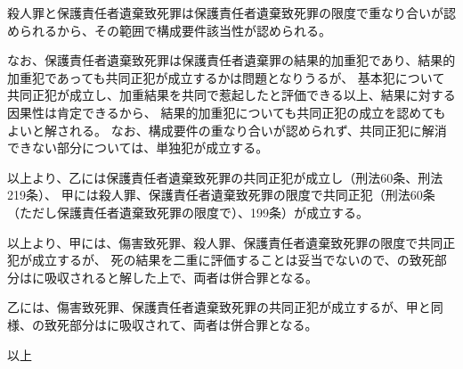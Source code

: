 \documentclass[11pt]{jsarticle}
\begin{document}
		殺人罪と保護責任者遺棄致死罪は保護責任者遺棄致死罪の限度で重なり合いが認められるから、その範囲で構成要件該当性が認められる。
		
	
		なお、保護責任者遺棄致死罪は保護責任者遺棄罪の結果的加重犯であり、結果的加重犯であっても共同正犯が成立するかは問題となりうるが、
		基本犯について共同正犯が成立し、加重結果を共同で惹起したと評価できる以上、結果に対する因果性は肯定できるから、
		結果的加重犯についても共同正犯の成立を認めてもよいと解される。
		なお、構成要件の重なり合いが認められず、共同正犯に解消できない部分については、単独犯が成立する。
		
		以上より、乙には保護責任者遺棄致死罪の共同正犯が成立し（刑法60条、刑法219条）、
		甲には殺人罪、保護責任者遺棄致死罪の限度で共同正犯（刑法60条（ただし保護責任者遺棄致死罪の限度で）、199条）が成立する。

以上より、甲には、傷害致死罪、殺人罪、保護責任者遺棄致死罪の限度で共同正犯が成立するが、
死の結果を二重に評価することは妥当でないので、の致死部分はに吸収されると解した上で、両者は併合罪となる。

乙には、傷害致死罪、保護責任者遺棄致死罪の共同正犯が成立するが、甲と同様、の致死部分はに吸収されて、両者は併合罪となる。	
	






\begin{flushright}
	以上
\end{flushright}
	
\end{document}
